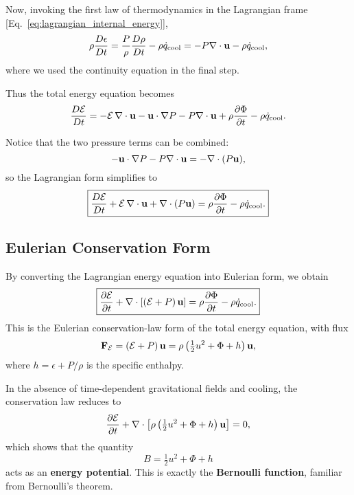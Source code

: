 Now, invoking the first law of thermodynamics in the Lagrangian frame [Eq.~\eqref{eq:lagrangian_internal_energy}],
\[
\rho \frac{D\epsilon}{Dt} = \frac{P}{\rho} \frac{D\rho}{Dt} - \rho \dot{q}_{\rm cool} 
= - P \nabla \cdot {\bf u} - \rho \dot{q}_{\rm cool},
\]
where we used the continuity equation in the final step.

Thus the total energy equation becomes
\begin{equation}
\frac{D\mathcal{E}}{Dt} 
= - \mathcal{E}\,\nabla\cdot{\bf u} 
- {\bf u}\cdot\nabla P 
- P \nabla\cdot{\bf u} 
+ \rho \frac{\partial \Phi}{\partial t} 
- \rho \dot{q}_{\rm cool}.
\end{equation}

Notice that the two pressure terms can be combined:
\[
-{\bf u}\cdot\nabla P - P \nabla\cdot{\bf u} = - \nabla\cdot(P {\bf u}),
\]
so the Lagrangian form simplifies to
\begin{equation}
\label{eq:lagrangian_energy}
\boxed{
\frac{D\mathcal{E}}{Dt} + \mathcal{E}\,\nabla\cdot{\bf u} 
+ \nabla\cdot(P{\bf u})
= \rho \frac{\partial \Phi}{\partial t} - \rho \dot{q}_{\rm cool}.}
\end{equation}

\subsection{Eulerian Conservation Form}

By converting the Lagrangian energy equation into Eulerian form, we obtain
\begin{equation}
\label{eq:eulerian_energy}
\boxed{
\frac{\partial \mathcal{E}}{\partial t} 
+ \nabla \cdot \left[ \left(\mathcal{E} + P\right) {\bf u} \right] 
= \rho \frac{\partial \Phi}{\partial t} - \rho \dot{q}_{\rm cool}.
}
\end{equation}
This is the Eulerian conservation-law form of the total energy equation,
with flux
\[
{\bf F}_{\mathcal{E}} = \left(\mathcal{E}+P\right){\bf u}
= \rho\left(\tfrac{1}{2}u^2 + \Phi + h\right){\bf u},
\]
where $h = \epsilon + P/\rho$ is the specific enthalpy. 

\medskip

In the absence of time-dependent gravitational fields and cooling, the
conservation law reduces to
\[
\frac{\partial \mathcal{E}}{\partial t} 
+ \nabla \cdot \left[\rho\left(\tfrac{1}{2}u^2 + \Phi + h\right){\bf u}\right] = 0,
\]
which shows that the quantity
\[
B = \tfrac{1}{2}u^2 + \Phi + h
\]
acts as an \textbf{energy potential}. This is exactly the
\textbf{Bernoulli function}, familiar from Bernoulli’s theorem. 

